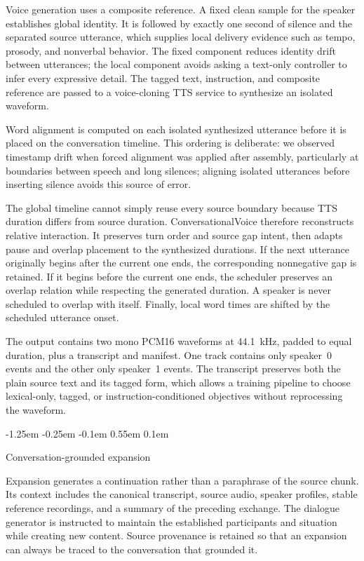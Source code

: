 \documentclass[10pt,twocolumn]{article}
\makeatletter
\renewcommand\subsection{%
  \@startsection{subsection}{2}{\z@}%
    {-1.25em \@plus -0.25em \@minus -0.1em}%
    {0.55em \@plus 0.1em}%
    {\normalfont\fontsize{10.5}{12.5}\selectfont\bfseries\raggedright
     \hyphenpenalty=10000\exhyphenpenalty=10000}}
\newcommand{\system}{\textsf{ConversationalVoice}\xspace}
\makeatother
\begin{document}
Voice generation uses a composite reference. A fixed clean sample for the speaker establishes global identity. It is followed by exactly one second of silence and the separated source utterance, which supplies local delivery evidence such as tempo, prosody, and nonverbal behavior. The fixed component reduces identity drift between utterances; the local component avoids asking a text-only controller to infer every expressive detail. The tagged text, instruction, and composite reference are passed to a voice-cloning TTS service to synthesize an isolated waveform.

Word alignment is computed on each isolated synthesized utterance before it is placed on the conversation timeline. This ordering is deliberate: we observed timestamp drift when forced alignment was applied after assembly, particularly at boundaries between speech and long silences; aligning isolated utterances before inserting silence avoids this source of error.

The global timeline cannot simply reuse every source boundary because TTS duration differs from source duration. \system therefore reconstructs relative interaction. It preserves turn order and source gap intent, then adapts pause and overlap placement to the synthesized durations. If the next utterance originally begins after the current one ends, the corresponding nonnegative gap is retained. If it begins before the current one ends, the scheduler preserves an overlap relation while respecting the generated duration. A speaker is never scheduled to overlap with itself. Finally, local word times are shifted by the scheduled utterance onset.

The output contains two mono PCM16 waveforms at 44.1~kHz, padded to equal duration, plus a transcript and manifest. One track contains only speaker~0 events and the other only speaker~1 events. The transcript preserves both the plain source text and its tagged form, which allows a training pipeline to choose lexical-only, tagged, or instruction-conditioned objectives without reprocessing the waveform.

\subsection{Conversation-grounded expansion}

Expansion generates a continuation rather than a paraphrase of the source chunk. Its context includes the canonical transcript, source audio, speaker profiles, stable reference recordings, and a summary of the preceding exchange. The dialogue generator is instructed to maintain the established participants and situation while creating new content. Source provenance is retained so that an expansion can always be traced to the conversation that grounded it.
\end{document}
